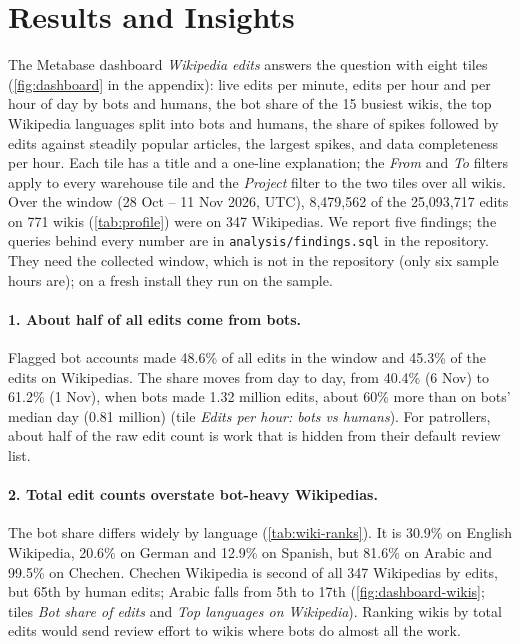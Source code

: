 \section{Results and Insights}\label{sec:results}

The Metabase dashboard \emph{Wikipedia edits} answers the question with eight tiles
(\cref{fig:dashboard} in the appendix): live edits per minute, edits per hour and per hour of day by bots and humans,
the bot share of the 15 busiest wikis, the top Wikipedia languages split into bots and humans, the share of
spikes followed by edits against steadily popular articles, the largest spikes, and data completeness per hour. Each tile has a title and a one-line explanation;
the \emph{From} and \emph{To} filters apply to every warehouse tile and the \emph{Project} filter to the two
tiles over all wikis. Over the window (28 Oct -- 11 Nov 2026, UTC), 8{,}479{,}562 of the 25{,}093{,}717
edits on 771 wikis (\cref{tab:profile}) were on 347 Wikipedias. We report five findings; the queries behind
every number are in \texttt{analysis/findings.sql} in the repository. They need the collected window,
which is not in the repository (only six sample hours are); on a fresh install they run on the sample.

\paragraph{1. About half of all edits come from bots.} Flagged bot accounts made 48.6\% of all edits in
the window and 45.3\% of the edits on Wikipedias. The share moves from day to day, from 40.4\% (6 Nov)
to 61.2\% (1 Nov), when bots made 1.32 million edits, about 60\% more than on bots' median day (0.81 million)
(tile \emph{Edits per hour: bots vs humans}). For patrollers, about half of the raw edit count is work
that is hidden from their default review list.

\paragraph{2. Total edit counts overstate bot-heavy Wikipedias.} The bot share differs widely
by language (\cref{tab:wiki-ranks}). It is 30.9\% on English Wikipedia, 20.6\% on German and 12.9\% on
Spanish, but 81.6\% on Arabic and 99.5\% on Chechen. Chechen Wikipedia is second of all 347 Wikipedias by
edits, but 65th by human edits; Arabic falls from 5th to 17th (\cref{fig:dashboard-wikis}; tiles \emph{Bot share of edits} and \emph{Top languages on Wikipedia}). Ranking wikis by total edits would send review effort to wikis where
bots do almost all the work.

